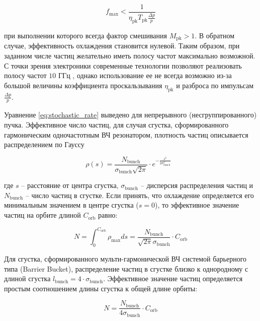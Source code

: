 \begin{equation}
f_{\textrm{max}}<\frac{1}{\eta_{\textrm{pk}}T_{\textrm{pk}}\frac{\Delta p}{p}}
\end{equation}	

\noindent при выполнении которого всегда фактор смешивания $M_{\textrm{pk}}>1$. В обратном случае, эффективность охлаждения становится нулевой. Таким образом, при заданном числе частиц желательно иметь полосу частот максимально возможной. С точки зрения электроники современные технологии позволяют реализовать полосу частот $10$ ГГц \cite{caspers:stochastic}, однако использование ее не всегда возможно из-за большой величины коэффициента проскальзывания $\eta_{\textrm{pk}}$ и разброса по импульсам $\frac{\Delta p}{p}$.

\noindent Уравнение \ref{eq:stochastic_rate} выведено для непрерывного (несгруппированного) пучка.  Эффективное число частиц, для случая сгустка, сформированного гармоническим одночастотным ВЧ резонатором, плотность частиц описывается распределением по Гауссу

\begin{equation}
\rho(s)=\frac{N_{\textrm{bunch}}}{\sigma_{\textrm{bunch}}\sqrt{2\pi}}\cdot e^{-\frac{s^2}{2\sigma_{\textrm{bunch}}^2}}\ \ \ 
\end{equation}	

\noindent где $s$ – расстояние от центра сгустка, $\sigma_{\textrm{bunch}}$ – дисперсия распределения частиц и $N_{\textrm{bunch}}$ – число частиц в сгустке. Если принять, что охлаждение определяется его минимальным значением в центре сгустка ($s=0$), то эффективное значение частиц на орбите длиной $C_{\textrm{orb}}$ равно:

\begin{equation}
N=\int_{0}^{C_{\textrm{orb}}}{\rho_{\textrm{max}}ds}=\frac{N_{\textrm{bunch}}}{\sqrt{2\pi}\sigma_{\textrm{bunch}}}\cdot C_{\textrm{orb}}
\end{equation}

\noindent Для сгустка, сформированного мульти-гармонической ВЧ системой барьерного типа (Barrier Bucket), распределение частиц в сгустке близко к однородному с длиной сгустка $l_{\textrm{bunch}}=4\cdot\sigma_{\textrm{bunch}}$. Эффективное значение частиц определяется простым соотношением длины сгустка к общей длине орбиты:

\begin{equation}
N=\frac{N_{\textrm{bunch}}}{{4\sigma}_{\textrm{bunch}}}\cdot C_{\textrm{orb}}
\end{equation}

